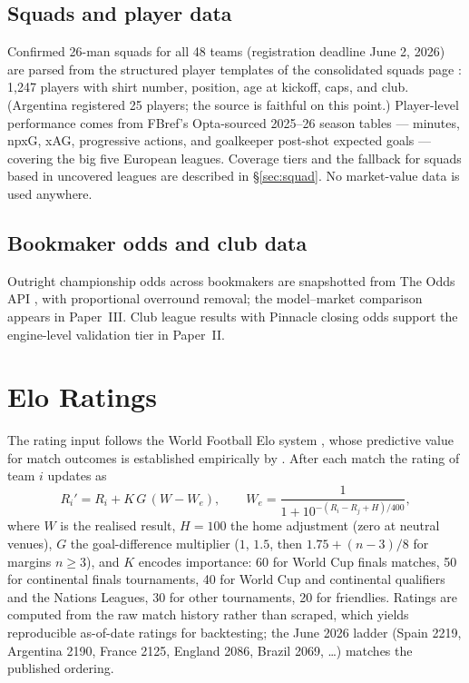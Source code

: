 \documentclass[11pt]{article}
\begin{document}
\subsection{Squads and player data}
Confirmed 26-man squads for all 48 teams (registration deadline June 2, 2026)
are parsed from the structured player templates of the consolidated squads
page \cite{wikisquads}: 1{,}247 players with shirt number, position, age at
kickoff, caps, and club. (Argentina registered 25 players; the source is
faithful on this point.) Player-level performance comes from FBref's
Opta-sourced 2025--26 season tables \cite{fbref} --- minutes, npxG, xAG,
progressive actions, and goalkeeper post-shot expected goals --- covering the
big five European leagues. Coverage tiers and the fallback for squads based in
uncovered leagues are described in \S\ref{sec:squad}. No market-value data is
used anywhere.

\subsection{Bookmaker odds and club data}
Outright championship odds across bookmakers are snapshotted from The Odds API
\cite{oddsapi}, with proportional overround removal; the model--market
comparison appears in Paper~III. Club league results with Pinnacle closing odds
\cite{footballdata} support the engine-level validation tier in Paper~II.

\section{Elo Ratings}\label{sec:elo}
The rating input follows the World Football Elo system \cite{eloratings}, whose
predictive value for match outcomes is established empirically by
\citet{hvattumarntzen2010}. After each match the rating of team $i$ updates as
\begin{equation}
  R_i' = R_i + K \, G \,(W - W_e), \qquad
  W_e = \frac{1}{1 + 10^{-(R_i - R_j + H)/400}},
\end{equation}
where $W$ is the realised result, $H{=}100$ the home adjustment (zero at
neutral venues), $G$ the goal-difference multiplier ($1$, $1.5$, then
$1.75 + (n-3)/8$ for margins $n \ge 3$), and $K$ encodes importance: 60 for
World Cup finals matches, 50 for continental finals tournaments, 40 for World
Cup and continental qualifiers and the Nations Leagues, 30 for other
tournaments, 20 for friendlies. Ratings are computed from the raw match
history rather than scraped, which yields reproducible as-of-date ratings for
backtesting; the June 2026 ladder (Spain 2219, Argentina 2190, France 2125,
England 2086, Brazil 2069, \ldots) matches the published ordering.
\end{document}
